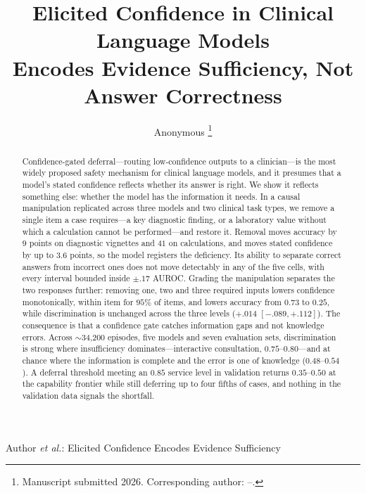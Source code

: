 \documentclass[journal,twoside]{IEEEtran}
\begin{document}
\title{Elicited Confidence in Clinical Language Models\\
Encodes Evidence Sufficiency, Not Answer Correctness}

\author{Anonymous
\thanks{Manuscript submitted 2026. Corresponding author: --.}}

%
{Author \MakeLowercase{\textit{et al.}}: Elicited Confidence Encodes Evidence Sufficiency}

\maketitle

\begin{abstract}
Confidence-gated deferral---routing low-confidence outputs to a clinician---is the most widely
proposed safety mechanism for clinical language models, and it presumes that a model's stated
confidence reflects whether its answer is right. We show it reflects something else: whether the
model has the information it needs. In a causal manipulation replicated across three models and two
clinical task types, we remove a single item a case requires---a key diagnostic finding, or a
laboratory value without which a calculation cannot be performed---and restore it. Removal moves
accuracy by $9$ points on diagnostic vignettes and $41$ on calculations, and moves stated confidence
by up to $3.6$ points, so the model registers the deficiency. Its ability to separate correct answers
from incorrect ones does not move detectably in any of the five cells, with every interval bounded
inside $\pm.17$ AUROC. Grading the
manipulation separates the two responses further: removing one, two and three required inputs lowers
confidence monotonically, within item for $95\%$ of items, and lowers accuracy from $0.73$ to
$0.25$, while discrimination is unchanged across the three levels ($+.014$ $[-.089,+.112]$). The
consequence is that a confidence gate catches information gaps and not knowledge errors. Across
$\sim$34{,}200 episodes, five models and seven evaluation sets, discrimination is strong where
insufficiency dominates---interactive consultation, $0.75$--$0.80$---and at chance where the
information is complete and the error is one of knowledge ($0.48$--$0.54$). A deferral threshold
meeting an $0.85$ service level in validation returns $0.35$--$0.50$ at the capability frontier while
still deferring up to four fifths of cases, and nothing in the validation data signals the shortfall.
\end{abstract}
\end{document}
